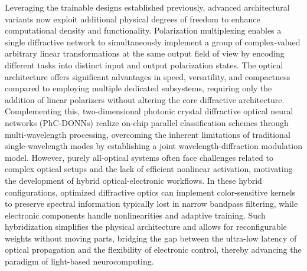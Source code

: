 \documentclass[11pt]{article}
\begin{document}
Leveraging the trainable designs established previously, advanced architectural variants now exploit additional physical degrees of freedom to enhance computational density and functionality. Polarization multiplexing enables a single diffractive network to simultaneously implement a group of complex-valued arbitrary linear transformations at the same output field of view by encoding different tasks into distinct input and output polarization states. \citep{doi_10_1038_s41377_022_00849_x_e31226af} The optical architecture offers significant advantages in speed, versatility, and compactness compared to employing multiple dedicated subsystems, requiring only the addition of linear polarizers without altering the core diffractive architecture. Complementing this, two-dimensional photonic crystal diffractive optical neural networks (PhC-DONNs) realize on-chip parallel classification schemes through multi-wavelength processing, overcoming the inherent limitations of traditional single-wavelength modes by establishing a joint wavelength-diffraction modulation model. However, purely all-optical systems often face challenges related to complex optical setups and the lack of efficient nonlinear activation, motivating the development of hybrid optical-electronic workflows. In these hybrid configurations, optimized diffractive optics can implement color-sensitive kernels to preserve spectral information typically lost in narrow bandpass filtering, while electronic components handle nonlinearities and adaptive training. Such hybridization simplifies the physical architecture and allows for reconfigurable weights without moving parts, bridging the gap between the ultra-low latency of optical propagation and the flexibility of electronic control, thereby advancing the paradigm of light-based neurocomputing. \citep{doi_10_1038_s41377_022_00849_x_e31226af} \citep{doi_10_1515_nanoph_2025_0168_86a0f7aa} \citep{doi_10_1038_s41598_018_30619_y_5f5bfb09} \citep{doi_10_1364_oe_462370_1269b480}
\end{document}
